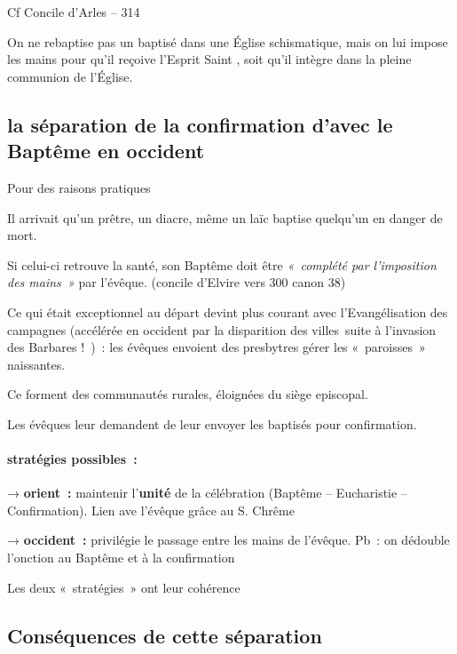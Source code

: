 Cf Concile d'Arles -- 314

On ne rebaptise pas un baptisé dans une Église schismatique, mais on lui
impose les mains pour qu'il reçoive l'Esprit Saint , soit qu'il intègre
dans la pleine communion de l'Église.

\hypertarget{la-suxe9paration-de-la-confirmation-davec-le-baptuxeame-en-occident}{%
\subsection{la séparation de la confirmation d'avec le Baptême en
occident}\label{la-suxe9paration-de-la-confirmation-davec-le-baptuxeame-en-occident}}

Pour des raisons pratiques

Il arrivait qu'un prêtre, un diacre, même un laïc baptise quelqu'un en
danger de mort.

Si celui-ci retrouve la santé, son Baptême doit être \emph{«~complété
par l'imposition des mains~»} par l'évêque. (concile d'Elvire vers 300
canon 38)

Ce qui était exceptionnel au départ devint plus courant avec
l'Evangélisation des campagnes (accélérée en occident par la disparition
des villes~suite à l'invasion des Barbares !~)~: les évêques envoient
des presbytres gérer les «~paroisses~» naissantes.

Ce forment des communautés rurales, éloignées du siège episcopal.

Les évêques leur demandent de leur envoyer les baptisés pour
confirmation.

 
 
\paragraph{  stratégies possibles~:} 

→ \textbf{orient~:} maintenir l'\textbf{unité} de la célébration
(Baptême -- Eucharistie -- Confirmation). Lien ave l'évêque grâce au S.
Chrême

→ \textbf{occident~:} privilégie le passage entre les mains de l'évêque.
Pb~: on dédouble l'onction au Baptême et à la confirmation

Les deux «~stratégies~» ont leur cohérence

\hypertarget{consuxe9quences-de-cette-suxe9paration}{%
\subsection{Conséquences de cette
séparation}\label{consuxe9quences-de-cette-suxe9paration}}

